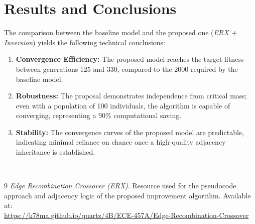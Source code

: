 \documentclass[11pt,a4paper]{article}
\begin{document}
\section{Results and Conclusions}
The comparison between the baseline model and the proposed one (\textit{ERX + Inversion}) yields the following technical conclusions:

\begin{enumerate}
    \item \textbf{Convergence Efficiency:} The proposed model reaches the target fitness between generations 125 and 330, compared to the 2000 required by the baseline model.
    \item \textbf{Robustness:} The proposal demonstrates independence from critical mass; even with a population of 100 individuals, the algorithm is capable of converging, representing a 90\% computational saving.
    \item \textbf{Stability:} The convergence curves of the proposed model are predictable, indicating minimal reliance on chance once a high-quality adjacency inheritance is established.
\end{enumerate}

 \\

\begin{thebibliography}{9}
\textit{Edge Recombination Crossover (ERX)}. Resource used for the pseudocode approach and adjacency logic of the proposed improvement algorithm. Available at:\\ \url{https://k78ma.github.io/quartz/4B/ECE-457A/Edge-Recombination-Crossover}
\end{thebibliography}
\end{document}
